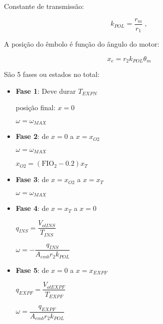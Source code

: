 \documentclass[a4paper,twosides,10pt]{article}
\begin{document}
Constante de transmissão:

\begin{equation}
  \label{eq:kpol}
  k_{POL} = \dfrac{r_m}{r_1} \; ,
\end{equation}

A posição do êmbolo é função do ângulo do motor:

\begin{equation}
  \label{eq:x-vs-theta_m}
  x_e = r_2 k_{POL} \theta_m
\end{equation}

São 5 fases ou estados no total:

\begin{itemize}
\item \textbf{Fase 1}: Deve durar $T_{EXPN}$
  
  posição final: $x = 0$
  
  $\omega = \omega_{MAX}$

\item \textbf{Fase 2}: de $x = 0$ a $x = x_{O2}$

  $\omega = \omega_{MAX}$

  $x_{O2} = (\mathrm{FIO_2} - 0.2) x_T$

\item \textbf{Fase 3}: de $x = x_{O2}$ a $x = x_T$

  $\omega = \omega_{MAX}$

\item \textbf{Fase 4}: de $x = x_T$ a $x = 0$

  $q_{INS} = \dfrac{V_{olINS}}{T_{INS}}$
    

  $\omega = - \dfrac{q_{INS}}{A_{emb} r_2 k_{POL}} $
    
\item \textbf{Fase 5}: de $x = 0$ a $x = x_{EXPF}$

  $q_{EXPF} = \dfrac{V_{olEXPF}}{T_{EXPF}}$

  $\omega = \dfrac{q_{EXPF}}{A_{emb} r_2 k_{POL}}$
    
\end{itemize}
\end{document}

